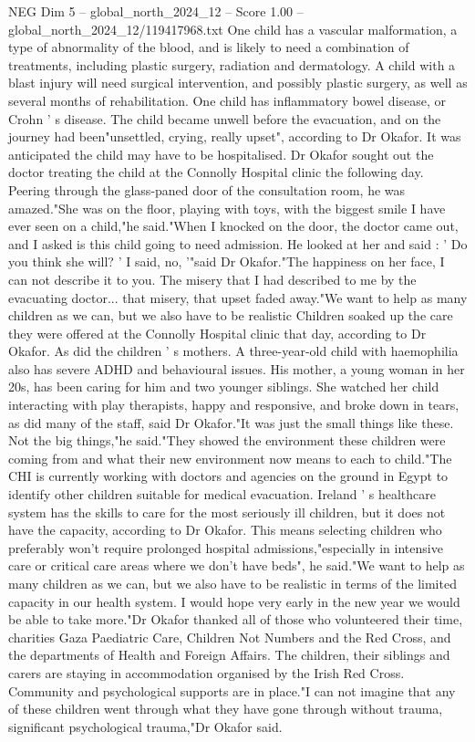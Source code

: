 \begin{textsample}{NEG Dim 5 – global\_north\_2024\_12 – Score 1.00 – global\_north\_2024\_12/119417968.txt}
One child has a vascular malformation, a type of abnormality of the blood, and is likely to need a combination of treatments, including plastic surgery, radiation and dermatology.
A child with a blast injury will need surgical intervention, and possibly plastic surgery, as well as several months of rehabilitation.
One child has inflammatory bowel disease, or Crohn ' s disease.
The child became unwell before the evacuation, and on the journey had been"unsettled, crying, really upset", according to Dr Okafor.
It was anticipated the child may have to be hospitalised.
Dr Okafor sought out the doctor treating the child at the Connolly Hospital clinic the following day.
Peering through the glass-paned door of the consultation room, he was amazed."She was on the floor, playing with toys, with the biggest smile I have ever seen on a child,"he said."When I knocked on the door, the doctor came out, and I asked is this child going to need admission.
He looked at her and said : ' Do you think she will? ' I said, no, '"said Dr Okafor."The happiness on her face, I can not describe it to you.
The misery that I had described to me by the evacuating doctor... that misery, that upset faded away."We want to help as many children as we can, but we also have to be realistic Children soaked up the care they were offered at the Connolly Hospital clinic that day, according to Dr Okafor.
As did the children ' s mothers.
A three-year-old child with haemophilia also has severe ADHD and behavioural issues.
His mother, a young woman in her 20s, has been caring for him and two younger siblings.
She watched her child interacting with play therapists, happy and responsive, and broke down in tears, as did many of the staff, said Dr Okafor."It was just the small things like these.
Not the big things,"he said."They showed the environment these children were coming from and what their new environment now means to each to child."The CHI is currently working with doctors and agencies on the ground in Egypt to identify other children suitable for medical evacuation.
Ireland ' s healthcare system has the skills to care for the most seriously ill children, but it does not have the capacity, according to Dr Okafor.
This means selecting children who preferably won't require prolonged hospital admissions,"especially in intensive care or critical care areas where we don't have beds", he said."We want to help as many children as we can, but we also have to be realistic in terms of the limited capacity in our health system.
I would hope very early in the new year we would be able to take more."Dr Okafor thanked all of those who volunteered their time, charities Gaza Paediatric Care, Children Not Numbers and the Red Cross, and the departments of Health and Foreign Affairs.
The children, their siblings and carers are staying in accommodation organised by the Irish Red Cross.
Community and psychological supports are in place."I can not imagine that any of these children went through what they have gone through without trauma, significant psychological trauma,"Dr Okafor said.

\end{textsample}
